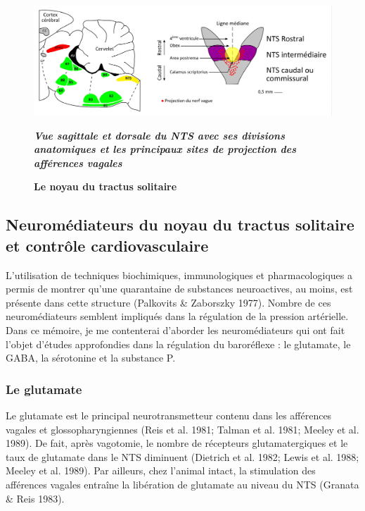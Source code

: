 \documentclass[a4paper,12pt,twoside]{report}
\begin{document}
\begin{figure}[t]

\begin{center}
 \includegraphics[width=18cm]{Figure9.jpg} 
\end{center}

\caption{\textbf{Le noyau du tractus solitaire}}

{\protect\parbox[t]{18cm}{
\begin{small}
\begin{center}
\textit{\textbf{Vue sagittale et dorsale du NTS avec ses divisions anatomiques et les principaux sites de projection des afférences vagales}}\end{center}
\end{small}}}

\label{Figure 9}

\end{figure}

\subsection{Neuromédiateurs du noyau du tractus solitaire et contrôle cardiovasculaire}

L’utilisation de techniques biochimiques, immunologiques et pharmacologiques a permis de montrer qu’une quarantaine de substances neuroactives, au moins, est présente dans cette structure (Palkovits \& Zaborszky 1977). Nombre de ces neuromédiateurs semblent impliqués dans la régulation de la pression artérielle. Dans ce mémoire, je me contenterai d’aborder les neuromédiateurs qui ont fait l’objet d’études approfondies dans la régulation du baroréflexe : le glutamate, le GABA, la sérotonine et la substance P.

\subsubsection{Le glutamate}

Le glutamate est le principal neurotransmetteur contenu dans les afférences vagales et glossopharyngiennes (Reis et al. 1981; Talman et al. 1981; Meeley et al. 1989). De fait, après vagotomie, le nombre de récepteurs glutamatergiques et le taux de glutamate dans le NTS diminuent (Dietrich et al. 1982; Lewis et al. 1988; Meeley et al. 1989). Par ailleurs, chez l’animal intact, la stimulation des afférences vagales entraîne la libération de glutamate au niveau du NTS (Granata \& Reis 1983). 
\end{document}
